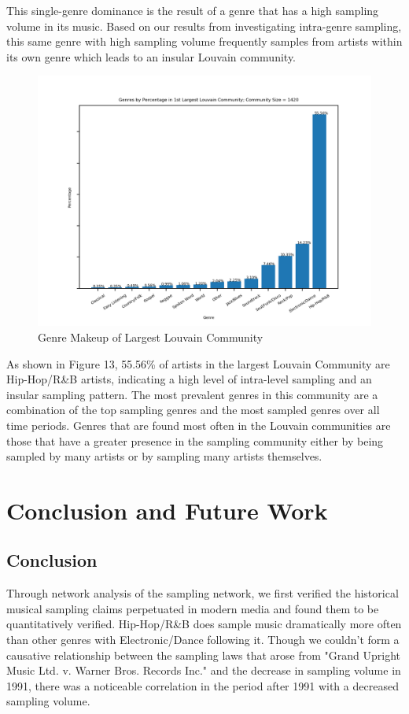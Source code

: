 \documentclass[pageno]{jpaper}
\begin{document}
This single-genre dominance is the result of a genre that has a high sampling volume in its music. Based on our results from investigating intra-genre sampling, this same genre with high sampling volume frequently samples from artists within its own genre which leads to an insular Louvain community.
\begin{figure}[H]
\includegraphics{LouvainCommunities/louvain1st}
\caption{Genre Makeup of Largest Louvain Community}
\label{fig:fig13}
\centering
\end{figure}
As shown in Figure 13, 55.56\% of artists in the largest Louvain Community are Hip-Hop/R\&B artists, indicating a high level of intra-level sampling and an insular sampling pattern. The most prevalent genres in this community are a combination of the top sampling genres and the most sampled genres over all time periods. Genres that are found most often in the Louvain communities are those that have a greater presence in the sampling community either by being sampled by many artists or by sampling many artists themselves.
\section{Conclusion and Future Work}
\subsection{Conclusion}
Through network analysis of the sampling network, we first verified the historical musical sampling claims perpetuated in modern media and found them to be quantitatively verified. Hip-Hop/R\&B does sample music dramatically more often than other genres with Electronic/Dance following it. Though we couldn't form a causative relationship between the sampling laws that arose from "Grand Upright Music Ltd. v. Warner Bros. Records Inc." and the decrease in sampling volume in 1991, there was a noticeable correlation in the period after 1991 with a decreased sampling volume.
\end{document}
